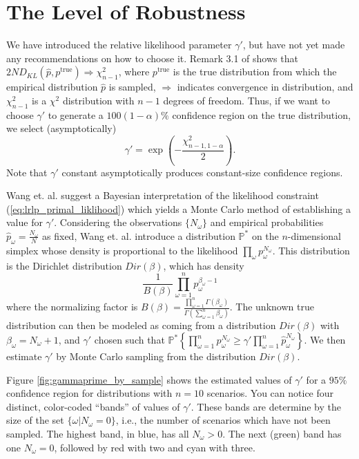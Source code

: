 \documentclass[11pt]{article}
\renewcommand{\P}{\mathbb{P}}
\begin{document}
\section{The Level of Robustness}

We have introduced the relative likelihood parameter $\gamma'$, but have not yet made any recommendations on how to choose it.
Remark 3.1 of \cite{pardo2005statistical} shows that $2ND_{KL}(\hat{p}, p^{\text{true}}) \Rightarrow \chi^2_{n-1}$, where $p^{\text{true}}$ is the true distribution from which the empirical distribution $\hat{p}$ is sampled, $\Rightarrow$ indicates convergence in distribution, and $\chi^2_{n-1}$ is a $\chi^2$ distribution with $n-1$ degrees of freedom.
Thus, if we want to choose $\gamma'$ to generate a $100(1-\alpha)\%$ confidence region on the true distribution, we select (asymptotically)
\begin{equation} \label{eq:asymptotic_gamma}
	\gamma' = \exp \left( -\frac{\chi^2_{n-1,1-\alpha}}{2} \right).
\end{equation}
Note that $\gamma'$ constant asymptotically produces constant-size confidence regions.

Wang et. al. \cite{wang2010likelihood} suggest a Bayesian interpretation of the likelihood constraint (\ref{eq:lrlp_primal_liklihood}) which yields a Monte Carlo method of establishing a value for $\gamma'$.
Considering the observations $\{N_\omega\}$ and empirical probabilities $\hat{p}_\omega = \frac{N_\omega}{N}$ as fixed, Wang et. al. \cite{wang2010likelihood} introduce a distribution $\P^*$ on the $n$-dimensional simplex whose density is proportional to the likelihood $\prod_\omega p_\omega^{N_\omega}$.
This distribution is the Dirichlet distribution $Dir(\beta)$, which has density
\[
	\frac{1}{B(\beta)} \prod_{\omega=1}^n p_\omega^{\beta_\omega-1}
\]
where the normalizing factor is $B(\beta) = \frac{\prod_{\omega=1}^n \Gamma(\beta_\omega)}{\Gamma\left( \sum_{\omega=1}^n \beta_\omega \right)}$.
The unknown true distribution can then be modeled as coming from a distribution $Dir(\beta)$ with $\beta_\omega = N_\omega + 1$, and $\gamma'$ chosen such that $\P^*\left\{ \prod_{\omega=1}^n p_\omega^{N_\omega} \geq \gamma' \prod_{\omega=1}^n \hat{p}_\omega^{N_\omega} \right\}$.
We then estimate $\gamma'$ by Monte Carlo sampling from the distribution $Dir(\beta)$.

Figure \ref{fig:gammaprime_by_sample} shows the estimated values of $\gamma'$ for a $95\%$ confidence region for distributions with $n = 10$ scenarios.
You can notice four distinct, color-coded ``bands'' of values of $\gamma'$.
These bands are determine by the size of the set $\{\omega | N_\omega = 0\}$, i.e., the number of scenarios which have not been sampled.
The highest band, in blue, has all $N_\omega > 0$.
The next (green) band has one $N_\omega = 0$, followed by red with two and cyan with three.
\end{document}
